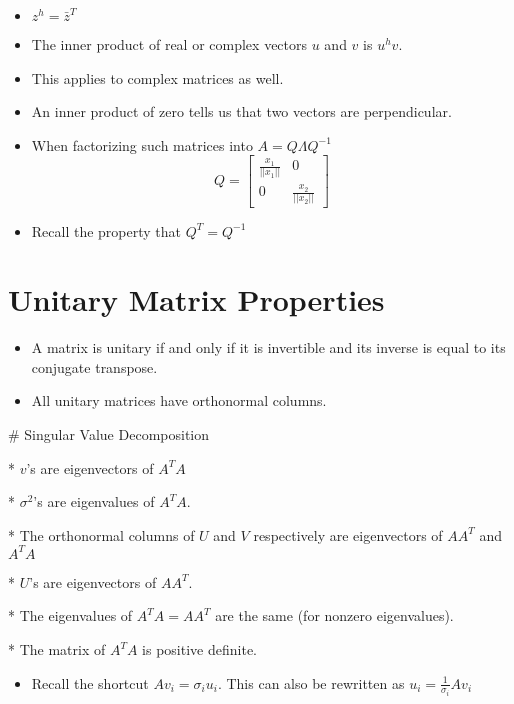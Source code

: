 \documentclass{article}
\begin{document}
\begin{itemize}
	\item $z^h = \bar{z}^T$
	\item The inner product of real or complex vectors $u$ and $v$ is $u^hv$.
	\item This applies to complex matrices as well.
	\item An inner product of zero tells us that two vectors are perpendicular.
	\item When factorizing such matrices into $A = Q \Lambda Q^{-1}$
	$$Q=\begin{bmatrix}
		\frac{x_1}{||x_1||} & 0 \\
		0 & \frac{x_2}{||x_2||}
	\end{bmatrix}
	$$
	\item Recall the property that $Q^T=Q^{-1}$
\end{itemize}

\section{Unitary Matrix Properties}

\begin{itemize}
	\item A matrix is unitary if and only if it is invertible and its inverse is equal to its conjugate transpose.
	\item All unitary matrices have orthonormal columns.
\end{itemize}

\begin{markdown}

# Singular Value Decomposition

* $v$'s are eigenvectors of $A^TA$

* $\sigma^2$'s are eigenvalues of $A^TA$.

* The orthonormal columns of $U$ and $V$ respectively are eigenvectors of $AA^T$ and $A^TA$

* $U$'s are eigenvectors of $AA^T$.

* The eigenvalues of $A^TA=AA^T$ are the same (for nonzero eigenvalues).

* The matrix of $A^TA$ is positive definite.

\end{markdown}

\begin{itemize}
	\item Recall the shortcut $Av_i=\sigma_i u_i$. This can also be rewritten as $u_i = \frac{1}{\sigma_i}Av_{i}$
\end{itemize}
\end{document}
